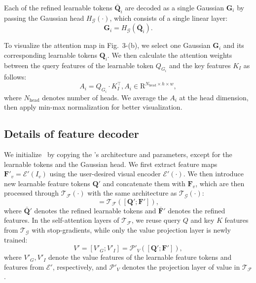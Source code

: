 Each of the refined learnable tokens $\bar{\mathbf{Q}}_i$ are decoded as a single Gaussian $\mathbf{G}_i$ by passing the Gaussian head $H_\mathcal{G}(\cdot)$, which consists of a single linear layer:
\begin{equation}
    \mathbf{G}_i = H_\mathcal{G}(\bar{\mathbf{Q}}_i).
\end{equation}

To visualize the attention map in Fig.~3-(b), we select one Gaussian $\mathbf{G}_i$ and its corresponding learnable tokens $\mathbf{Q}_i$. We then calculate the attention weights between the query features of the learnable token $Q_{G_i}$ and the key features $K_I$ as follows:
\begin{equation}
    A_i =  Q_{G_i} \cdot K_I^\intercal, A_i \in \mathrm{R}^{N_\text{head} \times h \times w},
\end{equation}
where $N_\text{head}$ denotes number of heads. We average the $A_i$ at the head dimension, then apply min-max normalization for better visualization.

\subsection{Details of feature decoder}
We initialize \oursF\ by copying the \ours's architecture and parameters, except for the learnable tokens and the Gaussian head. We first extract feature maps $\mathbf{F}'_v = \mathcal{E}'(I_v)$ using the user-desired visual encoder $\mathcal{E}'(\cdot)$. We then introduce new learnable feature tokens $\mathbf{Q}'$ and concatenate them with $\mathbf{F}_v$, which are then processed through $\mathcal{T}_\mathcal{F}(\cdot)$ with the same architecture as $\mathcal{T}_\mathcal{G}(\cdot)$:
\begin{equation}
    [\bar{\mathbf{Q}}';\bar{\mathbf{F}}'] = \mathcal{T}_\mathcal{F}([\mathbf{Q}';\mathbf{F}']),
\end{equation}
where $\bar{\mathbf{Q}}'$ denotes the refined learnable tokens and $\bar{\mathbf{F}}'$ denotes the refined features.
In the self-attention layers of $\mathcal{T}_\mathcal{F}$, we reuse query $Q$ and key $K$ features from $\mathcal{T}_\mathcal{G}$ with stop-gradients, while only the value projection layer is newly trained:
\begin{equation}
    V' = [V'_G;V'_I] = \mathcal{P}'_V([\mathbf{Q'};\mathbf{F'}]),
\end{equation}
where $V'_G, V'_I$ denote the value features of the learnable feature tokens and features from $\mathcal{E}'$, respectively, and $\mathcal{P}'_V$ denotes the projection layer of value in $\mathcal{T}_\mathcal{F}$.

